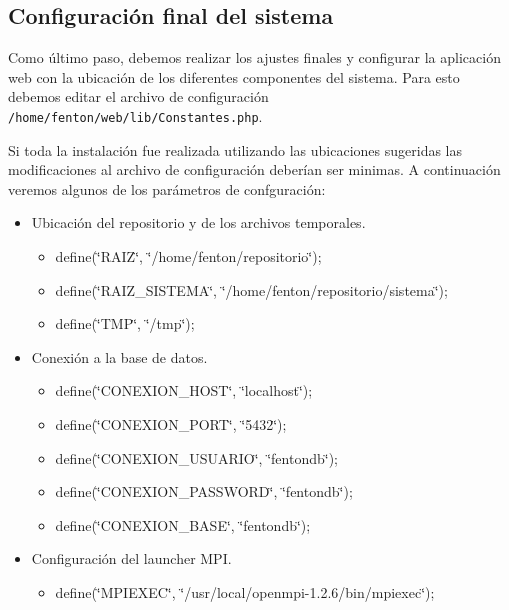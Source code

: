 \documentclass[a4paper,10pt,spanish]{article}
\begin{document}
\subsection{Configuraci\'{o}n final del sistema}

Como \'{u}ltimo paso, debemos realizar los ajustes finales y configurar la aplicaci\'{o}n web con la ubicaci\'{o}n de los diferentes componentes del sistema. Para esto debemos editar el archivo de configuraci\'{o}n \mbox{\texttt{/home/fenton/web/lib/Constantes.php}}.

Si toda la instalaci\'{o}n fue realizada utilizando las ubicaciones sugeridas las modificaciones al archivo de configuraci\'{o}n deber\'{i}an ser minimas. A continuaci\'{o}n veremos algunos de los par\'{a}metros de confguraci\'{o}n:

\begin{itemize}
\item Ubicaci\'{o}n del repositorio y de los archivos temporales.

\begin{itemize}
\item define(\char`\"{}RAIZ\char`\"{}, \char`\"{}/home/fenton/repositorio\char`\"{});
\item define(\char`\"{}RAIZ\_SISTEMA\char`\"{}, \char`\"{}/home/fenton/repositorio/sistema\char`\"{});
\item define(\char`\"{}TMP\char`\"{}, \char`\"{}/tmp\char`\"{});
\end{itemize}

\item Conexi\'{o}n a la base de datos.

\begin{itemize}
\item define(\char`\"{}CONEXION\_HOST\char`\"{}, \char`\"{}localhost\char`\"{});
\item define(\char`\"{}CONEXION\_PORT\char`\"{}, \char`\"{}5432\char`\"{});
\item define(\char`\"{}CONEXION\_USUARIO\char`\"{}, \char`\"{}fentondb\char`\"{});
\item define(\char`\"{}CONEXION\_PASSWORD\char`\"{}, \char`\"{}fentondb\char`\"{});
\item define(\char`\"{}CONEXION\_BASE\char`\"{}, \char`\"{}fentondb\char`\"{});
\end{itemize}

\item Configuraci\'{o}n del launcher MPI.

\begin{itemize}
\item define(\char`\"{}MPIEXEC\char`\"{}, \char`\"{}/usr/local/openmpi-1.2.6/bin/mpiexec\char`\"{});
\end{itemize}


\end{itemize}
\end{document}
